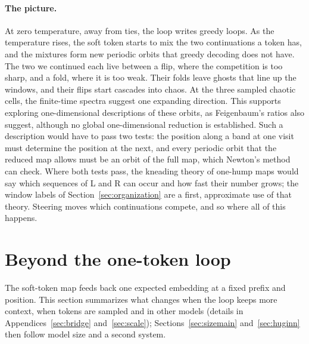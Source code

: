 \documentclass[11pt,letterpaper]{article}
\begin{document}
\paragraph{The picture.} At zero temperature, away from ties, the loop writes greedy loops. As the temperature rises, the soft token
starts to mix the two continuations a token has, and the mixtures form new periodic orbits that greedy decoding does not have.
The two we continued each live between a flip, where the competition is too sharp, and a fold, where it is too weak. Their folds leave
ghosts that line up the windows, and their flips start cascades into chaos. At the three sampled chaotic cells, the
finite-time spectra suggest one expanding direction. This supports exploring one-dimensional descriptions of these orbits, as Feigenbaum's ratios
also suggest, although no global one-dimensional reduction is established. Such a description would have to pass
two tests: the position along a band at one visit must determine the position at the next, and every periodic orbit
that the reduced map allows must be an orbit of the full map, which Newton's method can check. Where both tests pass,
the kneading theory of one-hump maps \cite{milnor1988iterated} would say which sequences of L and R can occur and how
fast their number grows; the window labels of Section~\ref{sec:organization} are a first, approximate use of that
theory. Steering
moves which continuations compete, and so where all of this happens.

\section{Beyond the one-token loop}
\label{sec:beyond}
The soft-token map feeds back one expected embedding at a fixed prefix and position. This section summarizes what
changes when the loop keeps more context, when tokens are sampled and in other models (details in
Appendices~\ref{sec:bridge} and~\ref{sec:scale}); Sections~\ref{sec:sizemain} and~\ref{sec:huginn} then follow model
size and a second system.
\end{document}
